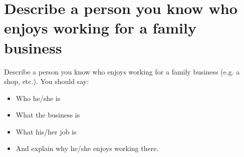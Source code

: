 \section{Describe a person you know who enjoys working for a family business}
\begin{ieltsprompt}
Describe a person you know who enjoys working for a family business (e.g. a shop, etc.).
You should say:
\begin{itemize}[leftmargin=2em, itemsep=2pt]
\item Who he/she is
\item What the business is
\item What his/her job is
\item And explain why he/she enjoys working there.
\end{itemize}
\end{ieltsprompt}
